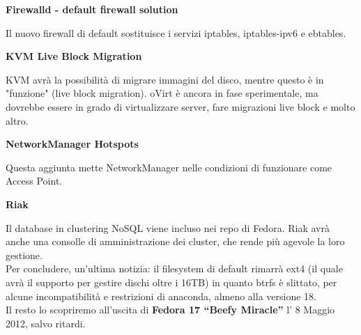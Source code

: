 \begin{center}
{\centering\bfseries Firewalld - default firewall solution}
\end{center}
Il nuovo firewall di default sostituisce i servizi iptables, iptables-ipv6 e ebtables.

\begin{center}
{\centering\bfseries KVM Live Block Migration}
\end{center}
KVM avrà la possibilità di migrare immagini del disco, mentre questo è in "funzione" (live block migration). oVirt è ancora in fase sperimentale, ma dovrebbe essere in grado di virtualizzare server, fare migrazioni live block e molto altro.

\begin{center}
{\centering\bfseries NetworkManager Hotspots}
\end{center}
Questa aggiunta mette NetworkManager nelle condizioni di funzionare come Access Point.

\begin{center}
{\centering\bfseries Riak}
\end{center}
Il database in clustering NoSQL viene incluso nei repo di Fedora. Riak avrà anche una consolle di amministrazione dei cluster, che rende più agevole la loro gestione.\\

Per concludere, un'ultima notizia: il filesystem di default rimarrà ext4 (il quale avrà il supporto per gestire dischi oltre i 16TB) in quanto btrfs è slittato, per alcune incompatibilità e restrizioni di anaconda, almeno alla versione 18.\\

Il resto lo scopriremo all'uscita di {\bfseries Fedora 17 ``Beefy Miracle''} l' 8 Maggio 2012, salvo ritardi.\\

